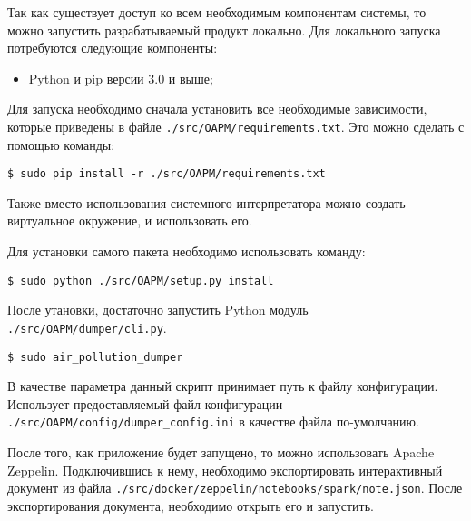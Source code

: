 Так как существует доступ ко всем необходимым компонентам системы, то можно запустить разрабатываемый продукт локально.
Для локального запуска потребуются следующие компоненты:

\begin{itemize}
    \item Python и pip версии 3.0 и выше;
\end{itemize}

Для запуска необходимо сначала установить все необходимые зависимости, которые приведены в файле \texttt{./src/OAPM/requirements.txt}.
Это можно сделать с помощью команды:
\begin{lstlisting}
$ sudo pip install -r ./src/OAPM/requirements.txt
\end{lstlisting}
Также вместо использования системного интерпретатора можно создать виртуальное окружение, и использовать его.

Для установки самого пакета необходимо использовать команду:
\begin{lstlisting}
$ sudo python ./src/OAPM/setup.py install
\end{lstlisting}

После утановки, достаточно запустить Python модуль \texttt{./src/OAPM/dumper/cli.py}.
\begin{lstlisting}
$ sudo air_pollution_dumper
\end{lstlisting}

В качестве параметра данный скрипт принимает путь к файлу конфигурации.
Использует предоставляемый файл конфигурации \texttt{./src/OAPM/config/dumper\_config.ini} в качестве файла по-умолчанию.

После того, как приложение будет запущено, то можно использовать Apache Zeppelin.
Подключившись к нему, необходимо экспортировать интерактивный документ из файла \texttt{./src/docker/zeppelin/notebooks/spark/note.json}.
После экспортирования документа, необходимо открыть его и запустить.

